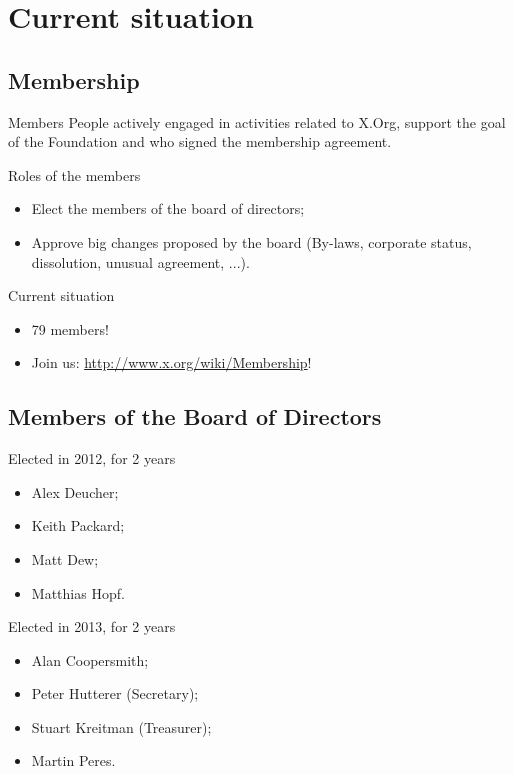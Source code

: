 \documentclass{beamer}
\begin{document}
	\section{Current situation}
		\subsection{Membership}
		\begin{frame}
			\begin{block}{Members}
				People actively engaged in activities related to X.Org, 
support the goal of the Foundation and who signed the membership agreement.
			\end{block}

			\begin{block}{Roles of the members}
				\begin{itemize}
					\item Elect the members of the board of
directors;
					\item Approve big changes proposed by the 
board (By-laws, corporate status, dissolution, unusual agreement, ...).
				\end{itemize}
			\end{block}

			\begin{block}{Current situation}
				\begin{itemize}
					\item 79 members!
					\item Join us:
\url{http://www.x.org/wiki/Membership}!
				\end{itemize}
			\end{block}
		\end{frame}

		\subsection{Members of the Board of Directors}
		\begin{frame}
			\begin{block}{Elected in 2012, for 2 years}
				\begin{itemize}
					\item Alex Deucher;
					\item Keith Packard;
					\item Matt Dew;
					\item Matthias Hopf.
				\end{itemize}
			\end{block}

			\begin{block}{Elected in 2013, for 2 years}
				\begin{itemize}
					\item Alan Coopersmith;
					\item Peter Hutterer (Secretary);
					\item Stuart Kreitman (Treasurer);
					\item Martin Peres.
				\end{itemize}
			\end{block}
		\end{frame}
\end{document}
